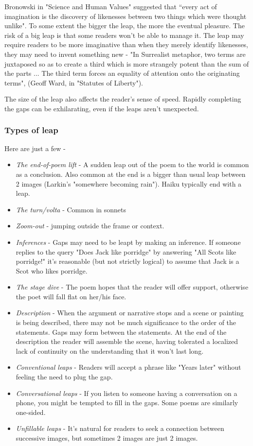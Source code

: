 \documentclass[11pt]{article}
\begin{document}
Bronowski in "Science and Human Values" suggested that ``every act of imagination is the discovery of likenesses between two things which were thought unlike". To some extent the bigger the leap, the more the eventual pleasure. The risk of a big leap is that some readers won't be able to manage it. The leap may require readers to be more imaginative than when they merely identify likenesses, they may need to invent something new - "In Surrealist metaphor, two terms are juxtaposed so as to create a third which is more strangely potent than the sum of the parts ... The third term forces an equality of attention onto the originating terms", (Geoff Ward, in "Statutes of Liberty").

The size of the leap also affects the reader's sense of speed. Rapidly completing the gaps can be exhilarating, even if the leaps aren't unexpected.

\subsubsection*{Types of leap}

Here are just a few -
\begin{itemize}
\item      \textit{The end-of-poem lift} - A sudden leap out of the poem to the world is common as a conclusion. Also common at the end is a bigger than usual leap between 2 images (Larkin's "somewhere becoming rain"). Haiku typically end with a leap.
\item      \textit{The turn/volta} - Common in sonnets
\item      \textit{Zoom-out} - jumping outside the frame or context.
\item      \textit{Inferences} - Gaps may need to be leapt by making an inference. If someone replies to the query "Does Jack like porridge" by answering "All Scots like porridge!" it's reasonable (but not strictly logical) to assume that Jack is a Scot who likes porridge.
 \item     \textit{The stage dive} - The poem hopes that the reader will offer support, otherwise the poet will fall flat on her/his face.
\item      \textit{Description} - When the argument or narrative stops and a scene or painting is being described, there may not be much significance to the order of the statements. Gaps may form between the statements. At the end of the description the reader will assemble the scene, having tolerated a localized lack of continuity on the understanding that it won't last long.
\item      \textit{Conventional leaps} - Readers will accept a phrase like "Years later" without feeling the need to plug the gap.
 \item     \textit{Conversational leaps} - If you listen to someone having a conversation on a phone, you might be tempted to fill in the gaps. Some poems are similarly one-sided.
 \item     \textit{Unfillable leaps} - It's natural for readers to seek a connection between successive images, but sometimes 2 images are just 2 images.
\end{itemize}
\end{document}
